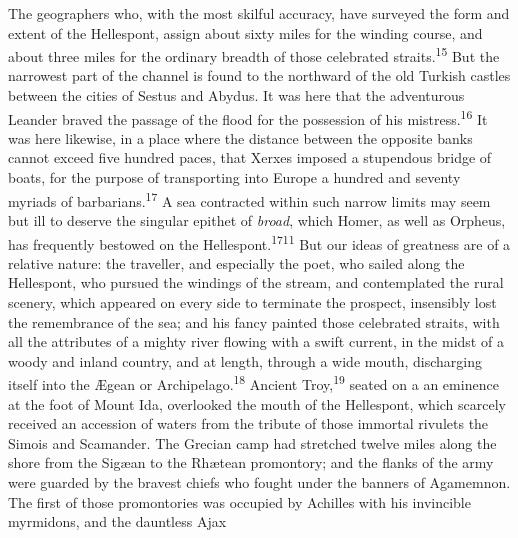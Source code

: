 
The geographers who, with the most skilful accuracy, have
surveyed the form and extent of the Hellespont, assign about
sixty miles for the winding course, and about three miles for the
ordinary breadth of those celebrated straits.\textsuperscript{15} But the
narrowest part of the channel is found to the northward of the
old Turkish castles between the cities of Sestus and Abydus. It
was here that the adventurous Leander braved the passage of the
flood for the possession of his mistress.\textsuperscript{16} It was here
likewise, in a place where the distance between the opposite
banks cannot exceed five hundred paces, that Xerxes imposed a
stupendous bridge of boats, for the purpose of transporting into
Europe a hundred and seventy myriads of barbarians.\textsuperscript{17} A sea
contracted within such narrow limits may seem but ill to deserve
the singular epithet of \textit{broad}, which Homer, as well as Orpheus,
has frequently bestowed on the Hellespont.\textsuperscript{1711} But our ideas of
greatness are of a relative nature: the traveller, and especially
the poet, who sailed along the Hellespont, who pursued the
windings of the stream, and contemplated the rural scenery, which
appeared on every side to terminate the prospect, insensibly lost
the remembrance of the sea; and his fancy painted those
celebrated straits, with all the attributes of a mighty river
flowing with a swift current, in the midst of a woody and inland
country, and at length, through a wide mouth, discharging itself
into the Ægean or Archipelago.\textsuperscript{18} Ancient Troy,\textsuperscript{19} seated on a an
eminence at the foot of Mount Ida, overlooked the mouth of the
Hellespont, which scarcely received an accession of waters from
the tribute of those immortal rivulets the Simois and Scamander.
The Grecian camp had stretched twelve miles along the shore from
the Sigæan to the Rhætean promontory; and the flanks of the army
were guarded by the bravest chiefs who fought under the banners
of Agamemnon. The first of those promontories was occupied by
Achilles with his invincible myrmidons, and the dauntless Ajax
